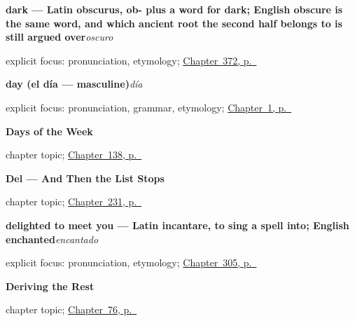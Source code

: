 \noindent\begin{minipage}[t]{\linewidth}
\raggedright
\textbf{dark — Latin obscurus, ob- plus a word for dark; English obscure is the same word, and which ancient root the second half belongs to is still argued over}\enspace\emph{oscuro}\par
\footnotesize explicit focus: pronunciation, etymology; \hyperref[ch:gris-y-rosa]{Chapter~372, p.~\pageref*{ch:gris-y-rosa}}
\end{minipage}\par\smallskip

\noindent\begin{minipage}[t]{\linewidth}
\raggedright
\textbf{day (el día — masculine)}\enspace\emph{día}\par
\footnotesize explicit focus: pronunciation, grammar, etymology; \hyperref[ch:first-words]{Chapter~1, p.~\pageref*{ch:first-words}}
\end{minipage}\par\smallskip

\noindent\begin{minipage}[t]{\linewidth}
\raggedright
\textbf{Days of the Week}\par
\footnotesize chapter topic; \hyperref[ch:spanish-days-of-the-week]{Chapter~138, p.~\pageref*{ch:spanish-days-of-the-week}}
\end{minipage}\par\smallskip

\noindent\begin{minipage}[t]{\linewidth}
\raggedright
\textbf{Del --- And Then the List Stops}\par
\footnotesize chapter topic; \hyperref[ch:del]{Chapter~231, p.~\pageref*{ch:del}}
\end{minipage}\par\smallskip

\noindent\begin{minipage}[t]{\linewidth}
\raggedright
\textbf{delighted to meet you — Latin incantare, to sing a spell into; English enchanted}\enspace\emph{encantado}\par
\footnotesize explicit focus: pronunciation, etymology; \hyperref[ch:nombre-y-apellido]{Chapter~305, p.~\pageref*{ch:nombre-y-apellido}}
\end{minipage}\par\smallskip

\noindent\begin{minipage}[t]{\linewidth}
\raggedright
\textbf{Deriving the Rest}\par
\footnotesize chapter topic; \hyperref[ch:spanish-derive-plurals]{Chapter~76, p.~\pageref*{ch:spanish-derive-plurals}}
\end{minipage}\par\smallskip

